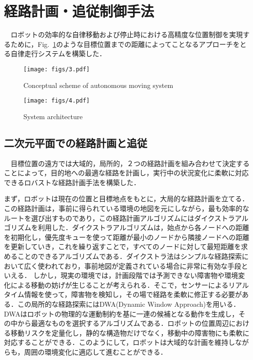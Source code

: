 \section{経路計画・追従制御手法}
\label{sec:control}
　ロボットの効率的な自律移動および停止時における高精度な位置制御を実現するために，Fig.~\ref{fig:fig3}のような目標位置までの距離によってことなるアプローチをとる自律走行システムを構築した．

\begin{figure}[!t]
\texttt{[image: figs/3.pdf]}
\caption{Conceptual scheme of autonomous moving system}
\label{fig:fig3}
\end{figure}

\begin{figure}[!t]
\texttt{[image: figs/4.pdf]}
\caption{System architecture}
\label{fig:fig4}
\end{figure}

\subsection{二次元平面での経路計画と追従}
　目標位置の遠方では大域的，局所的，２つの経路計画を組み合わせて決定することによって，目的地への最適な経路を計画し，実行中の状況変化に柔軟に対応できるロバストな経路計画手法を構築した．

まず，ロボットは現在の位置と目標地点をもとに，大局的な経路計画を立てる．この経路計画は，事前に得られている環境の地図を元にしながら，最も効率的なルートを選び出すものであり，この経路計画アルゴリズムにはダイクストラアルゴリズム\cite{dijkstra}を利用した．ダイクストラアルゴリズムは，始点から各ノードへの距離を初期化し，優先度キューを使って距離が最小のノードから隣接ノードへの距離を更新していき，これを繰り返すことで，すべてのノードに対して最短距離を求めることのできるアルゴリズムである．ダイクストラ法はシンプルな経路探索において広く使われており，事前地図が定義されている場合に非常に有効な手段といえる．
しかし，現実の環境では，計画段階では予測できない障害物や環境変化による移動の妨げが生じることが考えられる．そこで，センサーによるリアルタイム情報を使って，障害物を検知し，その場で経路を柔軟に修正する必要がある．この局所的な経路探索にはDWA(Dynamic Window Approach)\cite{DWA}を用いる．DWAはロボットの物理的な運動制約を基に一連の候補となる動作を生成し，その中から最適なものを選択するアルゴリズムである．ロボットの位置周辺における移動リスクを定量化し，静的な構造物だけでなく，移動中の障害物にも柔軟に対応することができる．このようにして，ロボットは大域的な計画を維持しながらも，周囲の環境変化に適応して進むことができる．


